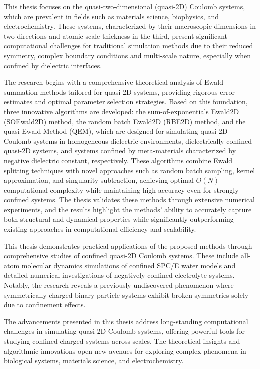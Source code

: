 This thesis focuses on the quasi-two-dimensional (quasi-2D) Coulomb systems, which are prevalent in fields such as materials science, biophysics, and electrochemistry. 
These systems, characterized by their macroscopic dimensions in two directions and atomic-scale thickness in the third, present significant computational challenges for traditional simulation methods due to their reduced symmetry, complex boundary conditions and multi-scale nature, especially when confined by dielectric interfaces.

The research begins with a comprehensive theoretical analysis of Ewald summation methods tailored for quasi-2D systems, providing rigorous error estimates and optimal parameter selection strategies. 
Based on this foundation, three innovative algorithms are developed: the sum-of-exponentials Ewald2D (SOEwald2D) method, the random batch Ewald2D (RBE2D) method, and the quasi-Ewald Method (QEM), which are designed for simulating quasi-2D Coulomb systems in homogeneous dielectric environments, dielectrically confined quasi-2D systems, and systems confined by meta-materials characterized by negative dielectric constant, respectively.
These algorithms combine Ewald splitting techniques with novel approaches such as random batch sampling, kernel approximation, and singularity subtraction, achieving optimal $O(N)$ computational complexity while maintaining high accuracy even for strongly confined systems.
The thesis validates these methods through extensive numerical experiments, and the results highlight the methods' ability to accurately capture both structural and dynamical properties while significantly outperforming existing approaches in computational efficiency and scalability.

This thesis demonstrates practical applications of the proposed methods through comprehensive studies of confined quasi-2D Coulomb systems. 
These include all-atom molecular dynamics simulations of confined SPC/E water models and detailed numerical investigations of negatively confined electrolyte systems. 
Notably, the research reveals a previously undiscovered phenomenon where symmetrically charged binary particle systems exhibit broken symmetries solely due to confinement effects.

The advancements presented in this thesis address long-standing computational challenges in simulating quasi-2D Coulomb systems, offering powerful tools for studying confined charged systems across scales. 
The theoretical insights and algorithmic innovations open new avenues for exploring complex phenomena in biological systems, materials science, and electrochemistry.